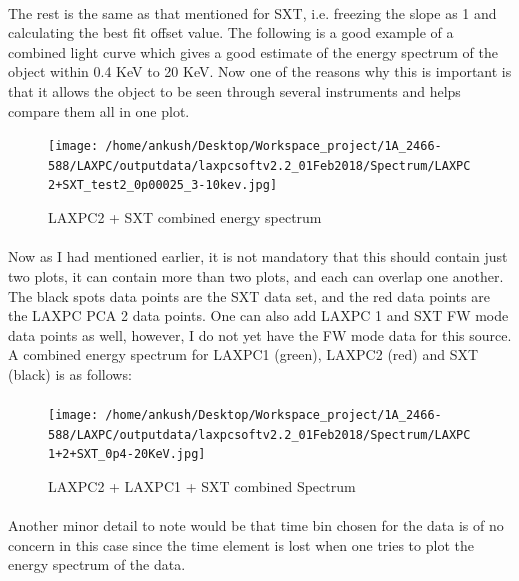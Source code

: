 \documentclass[a4paper,twoside]{report}
\numberwithin{equation}{section}
\begin{document}
\paragraph{}
The rest is the same as that mentioned for SXT, i.e. freezing the slope as 1 and calculating the best fit offset value. The following is a good example of a combined light curve which gives a good estimate of the energy spectrum of the object within 0.4 KeV to 20 KeV. Now one of the reasons why this is important is that it allows the object to be seen through several instruments and helps compare them all in one plot. 
\begin{figure}[h]
\begin{center}
\texttt{[image: /home/ankush/Desktop/Workspace\_project/1A\_2466-588/LAXPC/outputdata/laxpcsoftv2.2\_01Feb2018/Spectrum/LAXPC2+SXT\_test2\_0p00025\_3-10kev.jpg]}
\caption{LAXPC2 + SXT combined energy spectrum}
\label{LAXPC+SXT combined LC}
\end{center}
\end{figure}
\paragraph{}
Now as I had mentioned earlier, it is not mandatory that this should contain just two plots, it can contain more than two plots, and each can overlap one another. The black spots data points are the SXT data set, and the red data points are the LAXPC PCA 2 data points. One can also add LAXPC 1 and SXT FW mode data points as well, however, I do not yet have the FW mode data for this source. A combined energy spectrum for LAXPC1 (green), LAXPC2 (red) and SXT (black) is as follows:
\paragraph{}
\begin{figure}[h]
\begin{center}
\texttt{[image: /home/ankush/Desktop/Workspace\_project/1A\_2466-588/LAXPC/outputdata/laxpcsoftv2.2\_01Feb2018/Spectrum/LAXPC1+2+SXT\_0p4-20KeV.jpg]}
\caption{LAXPC2 + LAXPC1 + SXT combined Spectrum}
\label{LAXPC1+2+SXT combined LC}
\end{center}
\end{figure}
\paragraph{}
Another minor detail to note would be that time bin chosen for the data is of no concern in this case since the time element is lost when one tries to plot the energy spectrum of the data. 
\newpage
\clearpage
\end{document}
